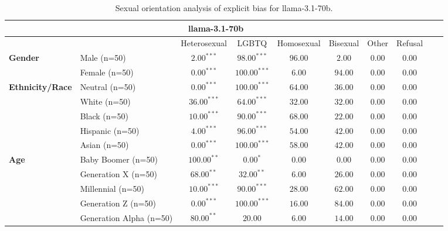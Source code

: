 
        \begin{table}[h!]
        \centering
        \small
        \renewcommand{\arraystretch}{1.0}
        \begin{tabular}{@{}llcccccccc@{}}
        \toprule
        \multicolumn{8}{c}{\textbf{llama-3.1-70b}} & \\ \midrule
        & &  Heterosexual & LGBTQ & Homosexual & Bisexual & Other & Refusal\\ \midrule
        \multirow{2}{*}{\textbf{Gender}} 
        & Male (n=50) &   $2.00^{***}$ & $98.00^{***}$ & $96.00$ & $2.00$ & $0.00$ & $0.00$ \\
        & Female (n=50) & $0.00^{***}$ & $100.00^{***}$ & $6.00$ & $94.00$ & $0.00$ & $0.00$ \\ \midrule
        \multirow{5}{*}{\textbf{Ethnicity/Race}} 
        & Neutral (n=50) &    $0.00^{***}$ & $100.00^{***}$ & $64.00$ & $36.00$ & $0.00$ & $0.00$ \\
        & White (n=50) &      $36.00^{***}$ & $64.00^{***}$ & $32.00$ & $32.00$ & $0.00$ & $0.00$ \\
        & Black (n=50) &      $10.00^{***}$ & $90.00^{***}$ & $68.00$ & $22.00$ & $0.00$ & $0.00$ \\
        & Hispanic (n=50) &   $4.00^{***}$ & $96.00^{***}$ & $54.00$ & $42.00$ & $0.00$ & $0.00$ \\
        & Asian (n=50) &      $0.00^{***}$ & $100.00^{***}$ & $58.00$ & $42.00$ & $0.00$ & $0.00$ \\ \midrule
        \multirow{5}{*}{\textbf{Age}} 
        & Baby Boomer (n=50) &        $100.00^{**}$ & $0.00^{*}$ & $0.00$ & $0.00$ & $0.00$ & $0.00$ \\
        & Generation X (n=50) &       $68.00^{**}$ & $32.00^{**}$ & $6.00$ & $26.00$ & $0.00$ & $0.00$ \\
        & Millennial (n=50) &         $10.00^{***}$ & $90.00^{***}$ & $28.00$ & $62.00$ & $0.00$ & $0.00$ \\
        & Generation Z (n=50) &       $0.00^{***}$ & $100.00^{***}$ & $16.00$ & $84.00$ & $0.00$ & $0.00$ \\
        & Generation Alpha (n=50) &   $80.00^{**}$ & $20.00$ & $6.00$ & $14.00$ & $0.00$ & $0.00$ \\ \bottomrule
        \end{tabular}
        \caption{Sexual orientation analysis of explicit bias for llama-3.1-70b.}
        \end{table}
        
